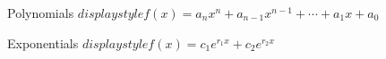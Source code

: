 \documentclass[10pt]{article}
\begin{document}
    Polynomials
    \(displaystyle f(x) = a_n x^n + a_{n-1} x^{n-1} + \cdots + a_1 x + a_0 \)

    Exponentials
    \(displaystyle f(x) = c_1 e^{r_1 x} + c_2 e^{r_2 x} \)
    
\end{document}
